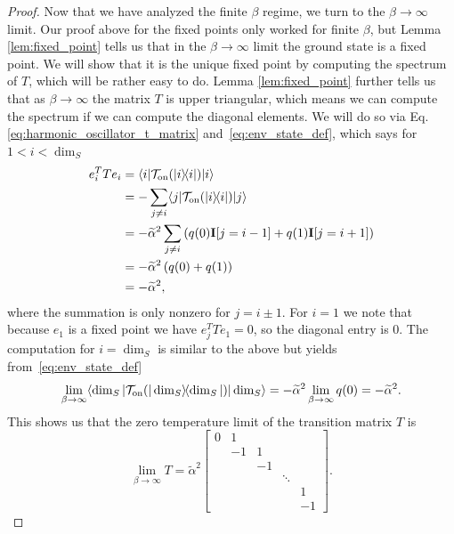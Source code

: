 \documentclass[
 amsmath,amssymb,
 aps,
onecolumn, 
nofootinbib]{revtex4-2}
\newcommand{\on}{\rm on}
\newcommand{\ket}[1]{|#1\rangle}
\newcommand{\bra}[1]{\langle #1|}
\newcommand{\ketbra}[2]{| #1\rangle\! \langle #2|}
\newcommand{\TT}{\mathcal{T}}
\begin{document}
\begin{proof}
    Now that we have analyzed the finite $\beta$ regime, we turn to the $\beta \to \infty$ limit. Our proof above for the fixed points only worked for finite $\beta$, but Lemma \ref{lem:fixed_point} tells us that in the $\beta \to \infty$ limit the ground state is a fixed point. We will show that it is the unique fixed point by computing the spectrum of $T$, which will be rather easy to do. Lemma \ref{lem:fixed_point} further tells us that as $\beta \to \infty$ the matrix $T$ is upper triangular, which means we can compute the spectrum if we can compute the diagonal elements. We will do so via Eq. \eqref{eq:harmonic_oscillator_t_matrix} and~\eqref{eq:env_state_def}, which says for $1 < i < \dim_S$
    \begin{align}
        e_i^T T e_i &= \bra{i} \TT_{\on}(\ketbra{i}{i}) \ket{i} \\
        &= -\sum_{j \neq i} \bra{j} \TT_{\on}(\ketbra{i}{i}) \ket{j} \\
        &= - \widetilde{\alpha}^2 \sum_{j \neq i} \left(q(0) \mathbf{I}[j = i - 1] +  q(1) \mathbf{I}[j = i + 1] \right) \\
        &= -\widetilde{\alpha}^2 \left(q(0) + q(1) \right) \\
        &= - \widetilde{\alpha}^2,
    \end{align}
    where the summation is only nonzero for $j = i \pm 1$. For $i = 1$ we note that because $e_1$ is a fixed point we have $e_j^T T e_1 = 0$, so the diagonal entry is 0. The computation for $i = \dim_S$ is similar to the above but yields from~\eqref{eq:env_state_def}
    \begin{equation}
        \lim_{\beta \to \infty} \bra{\dim_S} \TT_{\on}(\ketbra{\dim_S}{\dim_S}) \ket{\dim_S} = -\widetilde{\alpha}^2 \lim_{\beta \to \infty}  q(0) = - \widetilde{\alpha}^2.
    \end{equation}
    This shows us that the zero temperature limit of the transition matrix $T$ is 
\begin{equation}
    \lim_{\beta \to \infty} T = \widetilde{\alpha}^2 \begin{bmatrix}
        0 & 1 &   &\\
        & -1 & 1 &  &\\
        & & -1  & & \\
        & & & \ddots & \\
        & &     &       & 1 \\
        & &  & & -1
    \end{bmatrix}.
\end{equation}

\end{proof}
\end{document}
